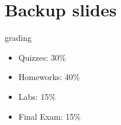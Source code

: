 \section{Backup slides}

\begin{frame}{grading}
    \begin{itemize}
    \item Quizzes: 30\%
    \item Homeworks: 40\%
    \item Labs: 15\%
    \item Final Exam: 15\%
    \end{itemize}
\end{frame}

\begin{frame}
\end{frame}

